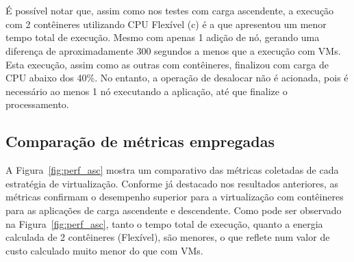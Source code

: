 \documentclass[twoside,english,brazilian]{UNISINOSartigo}
\begin{document}
\begin{figure}[ht!]
\\
\vspace{-0.4\baselineskip}
\\

\label{fig:trend_des}
\end{figure}

É possível notar que, assim como nos testes com carga ascendente, a execução com 2 contêineres utilizando CPU Flexível (c) é a que apresentou um menor tempo total de execução. Mesmo com apenas 1 adição de nó, gerando uma diferença de aproximadamente 300 segundos a menos que a execução com VMs. Esta execução, assim como as outras com contêineres, finalizou com carga de CPU abaixo dos 40\%. No entanto, a operação de desalocar não é acionada, pois é necessário ao menos 1 nó executando a aplicação, até que finalize o processamento.


\subsection{Comparação de métricas empregadas}
\label{comp_metricas}

A Figura~\ref{fig:perf_asc} mostra um comparativo das métricas coletadas de cada estratégia de virtualização. Conforme já destacado nos resultados anteriores, as métricas confirmam o desempenho superior para a virtualização com contêineres para as aplicações de carga ascendente e descendente. Como pode ser observado na Figura~\ref{fig:perf_asc},  tanto o tempo total de execução, quanto a energia calculada de 2 contêineres (Flexível), são menores, o que reflete num valor de custo calculado muito menor do que com VMs. 
\end{document}
